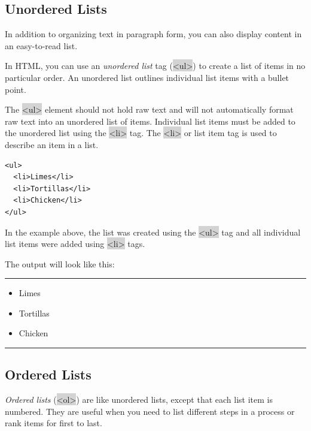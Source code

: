 \documentclass[11pt]{article}
\begin{document}
\subsection{Unordered Lists}
In addition to organizing text in paragraph form, you can also display content in an easy-to-read list.

In HTML, you can use an \textit{unordered list} tag (\colorbox{lightgray}{<ul>}) to create a list of items in no particular order. An unordered list outlines individual list items with a bullet point.

The \colorbox{lightgray}{<ul>} element should not hold raw text and will not automatically format raw text into an unordered list of items. Individual list items must be added to the unordered list using the \colorbox{lightgray}{<li>} tag. The \colorbox{lightgray}{<li>} or list item tag is used to describe an item in a list.
\begin{lstlisting}
<ul>
  <li>Limes</li>
  <li>Tortillas</li>
  <li>Chicken</li>
</ul>
\end{lstlisting}
In the example above, the list was created using the \colorbox{lightgray}{<ul>} tag and all individual list items were added using \colorbox{lightgray}{<li>} tags.

The output will look like this:
\vspace{-3mm}
\par\noindent\rule{\textwidth}{0.2pt}
\begin{itemize}[leftmargin = 24pt]
\item Limes
\item Tortillas
\item Chicken
\end{itemize}
\vspace{-3mm}
\par\noindent\rule{\textwidth}{0.2pt}

\subsection{Ordered Lists}
\textit{Ordered lists} (\colorbox{lightgray}{<ol>}) are like unordered lists, except that each list item is numbered. They are useful when you need to list different steps in a process or rank items for first to last.
\end{document}
